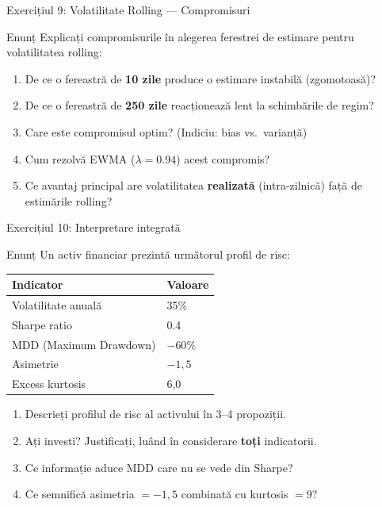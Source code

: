 \documentclass[9pt, aspectratio=169, t]{beamer}
\theoremstyle{definition}
\begin{document}
\begin{frame}{Exercițiul 9: Volatilitate Rolling --- Compromisuri}
\begin{block}{Enunț}
Explicați compromisurile în alegerea ferestrei de estimare pentru volatilitatea rolling:
\end{block}
\begin{enumerate}
    \item De ce o fereastră de \textbf{10 zile} produce o estimare instabilă (zgomotoasă)?
    \item De ce o fereastră de \textbf{250 zile} reacționează lent la schimbările de regim?
    \item Care este compromisul optim? (Indiciu: bias vs.\ varianță)
    \item Cum rezolvă EWMA ($\lambda = 0.94$) acest compromis?
    \item Ce avantaj principal are volatilitatea \textbf{realizată} (intra-zilnică) față de estimările rolling?
\end{enumerate}
\end{frame}

\begin{frame}{Exercițiul 10: Interpretare integrată}
\begin{block}{Enunț}
Un activ financiar prezintă următorul profil de risc:
\begin{center}
{\small
\renewcommand{\arraystretch}{1.2}
\begin{tabular}{ll}
\toprule
\textbf{Indicator} & \textbf{Valoare} \\
\midrule
Volatilitate anuală & 35\% \\
Sharpe ratio & 0.4 \\
MDD (Maximum Drawdown) & $-60\%$ \\
Asimetrie & $-1{,}5$ \\
Excess kurtosis & 6,0 \\
\bottomrule
\end{tabular}
}
\end{center}
\end{block}
\begin{enumerate}
    \item Descrieți profilul de risc al activului în 3--4 propoziții.
    \item Ați investi? Justificați, luând în considerare \textbf{toți} indicatorii.
    \item Ce informație aduce MDD care nu se vede din Sharpe?
    \item Ce semnifică asimetria $= -1{,}5$ combinată cu kurtosis $= 9$?
\end{enumerate}
\end{frame}
\end{document}
